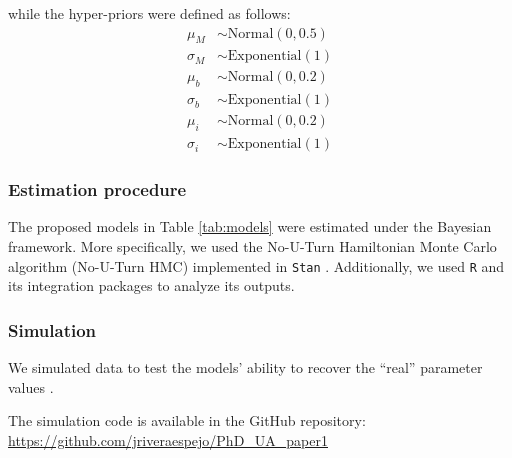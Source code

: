 while the hyper-priors were defined as follows:
%
\begin{align}
	\mu_{M} & \sim \text{Normal}(0, 0.5) \\
	\sigma_{M} & \sim \text{Exponential}(1) \\
	\mu_{b} & \sim \text{Normal}(0, 0.2) \\
	\sigma_{b} & \sim \text{Exponential}(1) \\
	\mu_{i} & \sim \text{Normal}(0, 0.2) \\
	\sigma_{i} & \sim \text{Exponential}(1)
\end{align}
%
%
\subsubsection{Estimation procedure} \label{ssSA:model_estimation}
The proposed models in Table \ref{tab:models} were estimated under the Bayesian framework. More specifically, we used the No-U-Turn Hamiltonian Monte Carlo algorithm (No-U-Turn HMC) \citep{Betancourt_et_al_2013, Duane_et_al_1987, Hoffman_et_al_2014, Neal_2012} implemented in \texttt{Stan} \citep{Stan_2020}. Additionally, we used \texttt{R} \citep{R_2015} and its integration packages \citep{RStan_2020} to analyze its outputs.

\begin{comment}
	\footnote{see \citet{Rivera_2021} (p. 11-13, 15-27) for a detailed description of its benefits and shortcomings.}
\end{comment}
%
%
\subsubsection{Simulation} \label{ssSA:model_simulation}
%
We simulated data to test the models' ability to recover the ``real'' parameter values \cite{Fogarty_et_al_2022}. 

The simulation code is available in the GitHub repository: \url{https://github.com/jriveraespejo/PhD_UA_paper1}

\begin{comment}
Several functional correlation between age and knowledge have been simulated, and the model used in the analysis - which includes age as a ordinal categorical predictor of knowledge with monotonically increasing effect - has been able to recover the different shapes. Causal effect of activities, family composition and schooling have been simulated and tested.

The simulated data have been used -albeit in a previous version- to estimate the minimum number of interviewees necessary to recover the parameter values. If individuals were to name a maximum of 300 items in the freelist, 50 interviewees would have been suffcient to obtain reliable estimates of the parameters. Given that data collection in vivo is much less regular and less controllable than in silico, we roughly doubled the number of interviewees and that of questions.
\end{comment}
%
%
